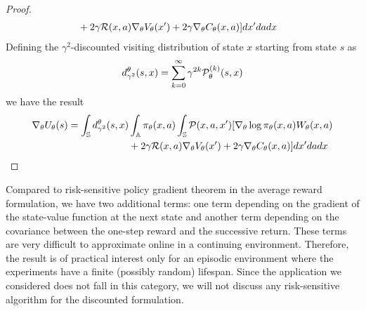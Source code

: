 \begin{proof}
\begin{equation*}
\begin{split}
						&+ 2 \gamma \mathcal{R}(x,a) \nabla_\theta V_\theta(x') + 2 \gamma \nabla_\theta C_\theta(x, a)]  dx' da dx
		\end{split}
	\end{equation*} 
	Defining the $\gamma^2$-discounted visiting distribution of state $x$ starting from state $s$ as
	\begin{equation*}
		d_{\gamma^2}^\theta(s, x) = \sum_{k=0}^{\infty} \gamma^{2k} \mathcal{P}_\theta^{(k)}(s, x)
	\end{equation*}
	we have the result
	\begin{equation*}
		\begin{split}
			\begin{split}
				\nabla_\theta U_\theta(s) = \int_{\mathbb{S}} d_{\gamma^2}^\theta(s, x) &\int_{\mathbb{A}} \pi_\theta(x,a) \int_{\mathbb{S}} \mathcal{P}(x,a,x') [\nabla_\theta \log \pi_\theta(x,a) W_\theta(x,a)\\ 
							&+ 2 \gamma \mathcal{R}(x,a) \nabla_\theta V_\theta(x') + 2 \gamma \nabla_\theta C_\theta(x, a)]  dx' da dx
			\end{split}
		\end{split}
	\end{equation*} 
\end{proof}
Compared to risk-sensitive policy gradient theorem in the average reward formulation, we have two additional terms: one term depending on the gradient of the state-value function at the next state and another term depending on the covariance between the one-step reward and the successive return. These terms are very difficult to approximate online in a continuing environment. Therefore, the result is of practical interest only for an episodic environment where the experiments have a finite (possibly random) lifespan. Since the application we considered does not fall in this category, we will not discuss any risk-sensitive algorithm for the discounted formulation. 
